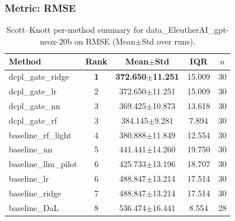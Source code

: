 \subsubsection*{Metric: RMSE}
\begin{table}[H]
\centering
\scriptsize
\setlength{\tabcolsep}{4pt}
\renewcommand{\arraystretch}{1.1}
\caption{Scott--Knott per-method summary for data\_EleutherAI\_gpt-neox-20b on RMSE (Mean$\pm$Std over runs).}
\label{tab:sk_data_EleutherAI_gpt-neox-20b_RMSE}
\begin{tabular}{l|c|c|c|c}
\hline
\textbf{Method} & \textbf{Rank} & \textbf{Mean$\pm$Std} & \textbf{IQR} & \textbf{$n$} \\
\hline
\rowcolor{red!15} dcpl\_gate\_ridge & \textbf{1} & \textbf{372.650$\pm$11.251} & 15.009 & 30 \\
dcpl\_gate\_lr & 2 & 372.650$\pm$11.251 & 15.009 & 30 \\
dcpl\_gate\_nn & 3 & 369.425$\pm$10.873 & 13.618 & 30 \\
dcpl\_gate\_rf & 3 & 384.145$\pm$9.281 & 7.894 & 30 \\
baseline\_rf\_light & 4 & 380.888$\pm$11.849 & 12.554 & 30 \\
baseline\_nn & 5 & 441.441$\pm$14.260 & 19.750 & 30 \\
baseline\_llm\_pilot & 6 & 425.733$\pm$13.196 & 18.707 & 30 \\
baseline\_lr & 6 & 488.847$\pm$13.214 & 17.514 & 30 \\
baseline\_ridge & 7 & 488.847$\pm$13.214 & 17.514 & 30 \\
baseline\_DaL & 8 & 536.474$\pm$16.441 & 8.554 & 28 \\
\hline
\end{tabular}
\end{table}


